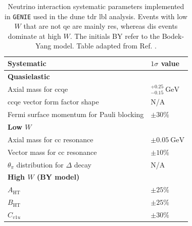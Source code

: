 \begin{table}[p!]
	\caption[Neutrino interaction systematic parameters implemented in \texttt{GENIE} used in the \gls{dune} \gls{tdr} \gls{lbl} analysis.]{Neutrino interaction systematic parameters implemented in \texttt{GENIE} used in the \gls{dune} \gls{tdr} \gls{lbl} analysis. Events with low $W$ that are not \gls{qe} are mainly \gls{res}, whereas \gls{dis} events dominate at high $W$. The initials BY refer to the Bodek-Yang model. Table adapted from Ref. \cite{DUNE2021}.}
	\begin{center}
		\begin{small}
			\begin{tabular}{l|l}
                Systematic                                     & $1\sigma$ value                 \\[2mm] \hline
                \rule{0pt}{1.1\normalbaselineskip}\textbf{Quasielastic}                          &                                 \\[2mm]
                Axial mass for \gls{cc}\gls{qe}                            & $^{+0.25}_{-0.15}~\mathrm{GeV}$ \\[2mm]
                \gls{cc}\gls{qe} vector form factor shape                  & N/A                             \\[2mm]
                Fermi surface momentum for Pauli blocking      & $\pm 30\%$                      \\[2mm] \hline
                \rule{0pt}{1.1\normalbaselineskip}\textbf{Low $W$}                               &                                 \\[2mm]
                Axial mass for \gls{cc} resonance                    & $\pm 0.05 ~ \mathrm{GeV}$       \\[2mm]
                Vector mass for \gls{cc} resonance                   & $\pm 10\%$                      \\[2mm]
                $\theta_{\pi}$ distribution for $\Delta$ decay & N/A                             \\[2mm] \hline
                \rule{0pt}{1.1\normalbaselineskip}\textbf{High $W$ (BY model)}                   &                                 \\[2mm]
                $A_{\mathrm{HT}}$                              & $\pm 25\%$                      \\[2mm]
                $B_{\mathrm{HT}}$                              & $\pm 25\%$                      \\[2mm]
                $C_{v1u}$                                      & $\pm 30\%$                      \\[2mm]

\end{tabular}
\end{small}
\end{center}
\end{table}
